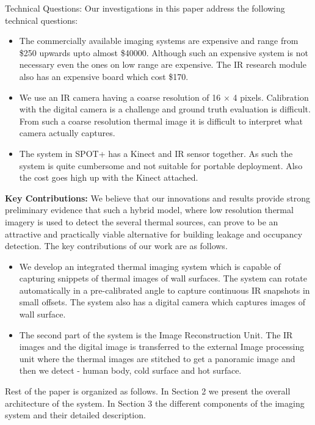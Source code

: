 \documentclass{sig-alternate}
\begin{document}
\indent Technical Questions: Our investigations in this paper address the following technical questions:
 \begin{itemize}
 \item The commercially available imaging systems are expensive and range from \$250 upwards upto almost \$40000. Although such an expensive system is not necessary even the ones on low range are expensive. The IR research module also has an expensive board which cost \$170.

 \item We use an IR camera having a coarse resolution of 16 $\times$ 4 pixels. Calibration with the digital camera is a challenge and ground truth evaluation is difficult. From such a coarse resolution thermal image it is difficult to interpret what camera actually captures.

 \item The system in SPOT+ has a Kinect and IR sensor together. As such the system is quite cumbersome and not suitable for portable deployment. Also the cost goes high up with the Kinect attached.
 \end{itemize}

 \indent \textbf{Key Contributions:} We believe that our innovations and results provide strong preliminary evidence that such a hybrid model, where low resolution thermal imagery is used to detect the several thermal sources, can prove to be an attractive and practically viable alternative for building leakage and occupancy detection. The key contributions of our work are as follows.

 \begin{itemize}
 \item We develop an integrated thermal imaging system which is capable of capturing snippets of thermal images of wall surfaces. The system can rotate automatically in a pre-calibrated angle to capture continuous IR snapshots in small offsets. The system also has a digital camera which captures images of wall surface.

 \item The second part of the system is the Image Reconstruction Unit. The IR images and the digital image is transferred to the external Image processing unit where the thermal images are stitched to get a panoramic image and then we detect - human body, cold surface and hot surface.
 \end{itemize}

 Rest of the paper is organized as follows. In Section 2 we present the overall architecture of the system. In Section 3 the different components of the imaging system and their detailed description.
\end{document}
